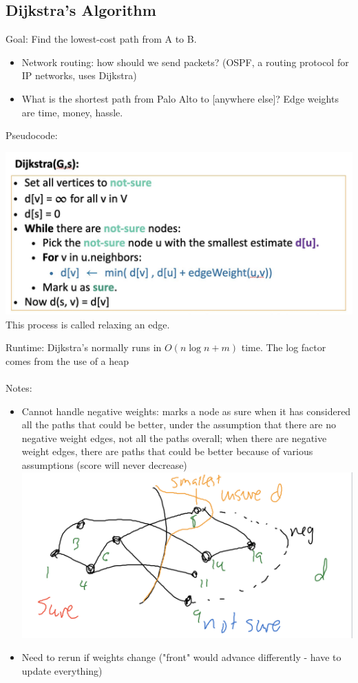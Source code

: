 \documentclass[12pt]{article}
\begin{document}
\subsection*{Dijkstra's Algorithm}
Goal: Find the lowest-cost path from A to B. 
\begin{itemize}
    \item Network routing: how should we send packets? (OSPF, a routing protocol for IP networks, uses Dijkstra)
    \item What is the shortest path from Palo Alto to [anywhere else]? Edge weights are time, money, hassle.
\end{itemize}
Pseudocode:
\begin{center}
\includegraphics[scale=0.5]{dijkstra.png} 
\\
This process is called relaxing an edge.
\end{center}
Runtime: Dijkstra’s normally runs in $O(n \log n + m)$ time. The log factor comes from the use of a heap
\\\\
Notes:
\begin{itemize}
\item Cannot handle negative weights: marks a node as sure when it has considered all the paths that could be better, under the assumption that there are no negative weight edges, not all the paths overall; when there are negative weight edges, there are paths that could be better because of various assumptions (score will never decrease)
\includegraphics[scale=0.3]{dijkstranegative.png} 
\\
\item Need to rerun if weights change ("front" would advance differently - have to update everything)
\end{itemize}
\end{document}

